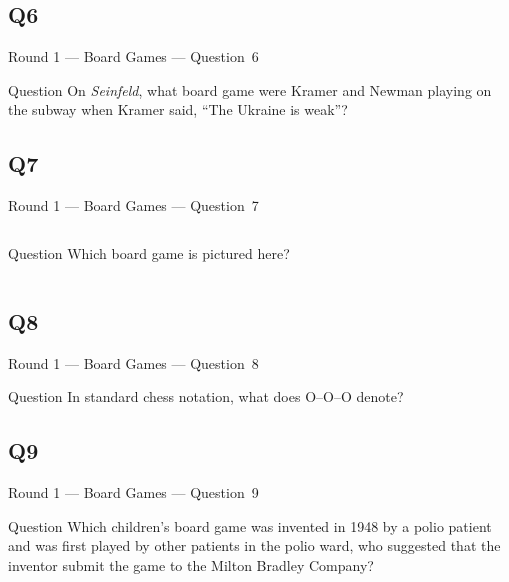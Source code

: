 \documentclass[11pt]{beamer}
\begin{document}
\subsection*{Q6}
\begin{frame}[t]{Round 1 --- Board Games --- \mbox{Question 6}}
    \vspace{-0.5em}
    \begin{block}{Question}
        On \emph{Seinfeld}, what board game were Kramer and Newman playing on the subway when Kramer said, ``The Ukraine is weak''?
    \end{block}
\end{frame}
\subsection*{Q7}
\begin{frame}[t]{Round 1 --- Board Games --- \mbox{Question 7}}
    \vspace{-0.5em}
    \begin{columns}[T,totalwidth=\linewidth]
        \begin{column}{0.32\linewidth}
            \begin{block}{Question}
                Which board game is pictured here?
            \end{block}
        \end{column}
        \begin{column}{0.65\linewidth}
            \begin{center}
                \texttt{[image: \{Images/trivialpursuit]}.jpg}
            \end{center}
        \end{column}
    \end{columns}
\end{frame}
\subsection*{Q8}
\begin{frame}[t]{Round 1 --- Board Games --- \mbox{Question 8}}
    \vspace{-0.5em}
    \begin{block}{Question}
        In standard chess notation, what does O--O--O denote?
    \end{block}
\end{frame}
\subsection*{Q9}
\begin{frame}[t]{Round 1 --- Board Games --- \mbox{Question 9}}
    \vspace{-0.5em}
    \begin{block}{Question}
        Which children's board game was invented in 1948 by a polio patient and was first played by other patients in the polio ward, who suggested that the inventor submit the game to the Milton Bradley Company?
    \end{block}
\end{frame}
\end{document}
